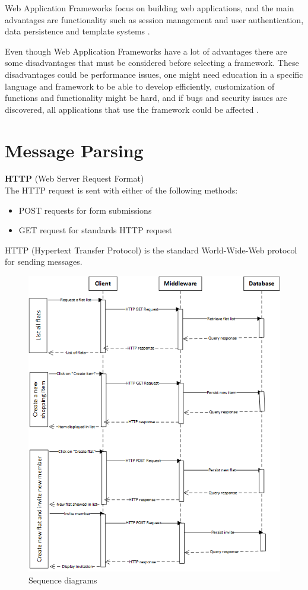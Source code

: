 \documentclass{sig-alt-release2}
\begin{document}
Web Application Frameworks focus on building web applications, and the main
advantages are functionality such as session management and user authentication,
data persistence and template systems \cite{x10}.

Even though Web Application Frameworks have a lot of advantages there are some
disadvantages that must be considered before selecting a framework. These
disadvantages could be performance issues, one might need education in a
specific language and framework to be able to develop efficiently, customization
of functions and functionality might be hard, and if bugs and security issues
are discovered, all applications that use the framework could be affected
\cite{x11}.

\section{Message Parsing}

\noindent
\textbf{HTTP} (Web Server Request Format) \\
The HTTP request is sent with either of the following methods:
\begin{itemize}
\item POST requests for form submissions
\item GET request for standards HTTP request
\end{itemize}

HTTP (Hypertext Transfer Protocol) is the standard World-Wide-Web protocol for
sending messages.

\begin{figure}[!ht]
\centering
\includegraphics[scale=0.5]{sequencediagrams}
\caption{Sequence diagrams}
\label{fig:sequence}
\end{figure}
\end{document}
